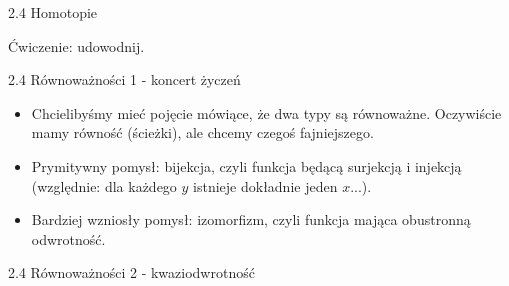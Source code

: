 \documentclass{beamer}
\begin{document}
\begin{frame}{2.4 Homotopie}


Ćwiczenie: udowodnij.

\end{frame}

\begin{frame}{2.4 Równoważności 1 - koncert życzeń}
\begin{itemize}
	\item Chcielibyśmy mieć pojęcie mówiące, że dwa typy są równoważne. Oczywiście mamy równość (ścieżki), ale chcemy czegoś fajniejszego.
	\item Prymitywny pomysł: bijekcja, czyli funkcja będącą surjekcją i injekcją (względnie: dla każdego $y$ istnieje dokładnie jeden $x$...).
	\item Bardziej wzniosły pomysł: izomorfizm, czyli funkcja mająca obustronną odwrotność.
\end{itemize}
\end{frame}

\begin{frame}{2.4 Równoważności 2 - kwaziodwrotność}


\end{frame}
\end{document}
